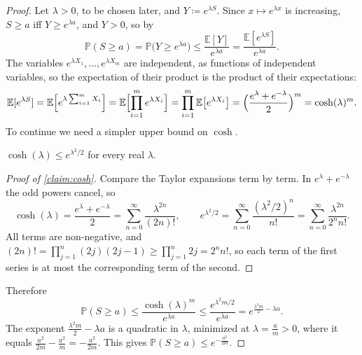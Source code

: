 \begin{proof}
    Let \(\lambda > 0\), to be chosen later, and \(Y \coloneqq e^{\lambda S}\). Since \(x \mapsto e^{\lambda x}\) is increasing, \(S \ge a\) iff \(Y \ge e^{\lambda a}\), and \(Y > 0\), so by 
    \[
        \mathbb{P}(S \ge a) = \mathbb{P}\bigl( Y \ge e^{\lambda a} \bigr) \le \frac{\mathbb{E}[Y]}{e^{\lambda a}} = \frac{\mathbb{E}[e^{\lambda S}]}{e^{\lambda a}} .
    \]
    The variables \(e^{\lambda X_{1}}, \ldots, e^{\lambda X_{m}}\) are independent, as functions of independent variables, so the expectation of their product is the product of their expectations:
    \[
        \mathbb{E}[e^{\lambda S}]
        = \mathbb{E}\Bigl[ e^{\lambda \sum_{i=1}^{m} X_{i}} \Bigr]
        = \mathbb{E}\Bigl[ \prod_{i=1}^{m} e^{\lambda X_{i}} \Bigr]
        = \prod_{i=1}^{m} \mathbb{E}\bigl[ e^{\lambda X_{i}} \bigr]
        = \Bigl( \frac{e^{\lambda} + e^{-\lambda}}{2} \Bigr)^{m}
        = \cosh(\lambda)^{m} .
    \]
    To continue we need a simpler upper bound on \(\cosh\).

    \begin{claim}\label{claim:cosh}
        \(\cosh(\lambda) \le e^{\lambda^{2}/2}\) for every real \(\lambda\).
    \end{claim}

    \begin{proof}[Proof of \autoref{claim:cosh}]
        Compare the Taylor expansions term by term. In \(e^{\lambda} + e^{-\lambda}\) the odd powers cancel, so
        \[
            \cosh(\lambda) = \frac{e^{\lambda} + e^{-\lambda}}{2} = \sum_{n=0}^{\infty} \frac{\lambda^{2n}}{(2n)!} ,
            \qquad
            e^{\lambda^{2}/2} = \sum_{n=0}^{\infty} \frac{(\lambda^{2}/2)^{n}}{n!} = \sum_{n=0}^{\infty} \frac{\lambda^{2n}}{2^{n} n!} .
        \]
        All terms are non-negative, and \((2n)! = \prod_{j=1}^{n} (2j)(2j-1) \ge \prod_{j=1}^{n} 2j = 2^{n} n!\), so each term of the first series is at most the corresponding term of the second.
    \end{proof}

    Therefore
    \[
        \mathbb{P}(S \ge a) \le \frac{\cosh(\lambda)^{m}}{e^{\lambda a}} \le \frac{e^{\lambda^{2} m/2}}{e^{\lambda a}} = e^{\frac{\lambda^{2} m}{2} - \lambda a} .
    \]
    The exponent \(\frac{\lambda^{2} m}{2} - \lambda a\) is a quadratic in \(\lambda\), minimized at \(\lambda = \frac{a}{m} > 0\), where it equals \(\frac{a^{2}}{2m} - \frac{a^{2}}{m} = -\frac{a^{2}}{2m}\). This gives \(\mathbb{P}(S \ge a) \le e^{-\frac{a^{2}}{2m}}\).
\end{proof}

